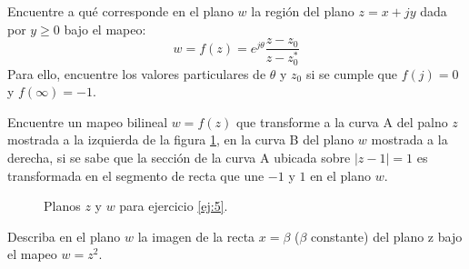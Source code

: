 \begin{ejercicio}
    Encuentre a qué corresponde en el plano $w$ la región del plano $z=x+jy$ dada por $y \geq 0$ bajo el mapeo:
    $$ w = f(z) = e^{j\theta} \frac{z-z_0}{z-z_0^*} $$
    Para ello, encuentre los valores particulares de $\theta$ y $z_0$ si se cumple que $f(j)=0$ y $f(\infty) = -1$.
\end{ejercicio}

\begin{ejercicio}
    Encuentre un mapeo bilineal $w=f(z)$ que transforme a la curva A del palno $z$ mostrada a la izquierda de la figura \ref{fig:map3-4}, en la curva B del plano $w$ mostrada a la derecha, si se sabe que la sección de la curva A ubicada sobre $|z-1| = 1$ es transformada en el segmento de recta que une $-1$ y $1$ en el plano $w$.
    \label{ej:5}
\end{ejercicio}

\begin{figure}[!h]
    \centering
    \caption{Planos $z$ y $w$ para ejercicio \ref{ej:5}.}
    \label{fig:map3-4}
\end{figure}

\begin{ejercicio}
    Describa en el plano $w$ la imagen de la recta $x=\beta$ ($\beta$ constante) del plano z bajo el mapeo $w=z^2$.
\end{ejercicio}
